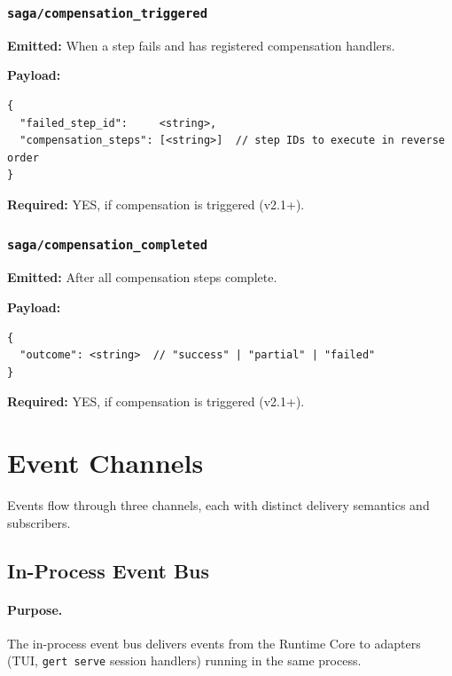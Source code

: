 \subsubsection{\texttt{saga/compensation\_triggered}}

\textbf{Emitted:} When a step fails and has registered compensation handlers.

\textbf{Payload:}
\begin{verbatim}
{
  "failed_step_id":     <string>,
  "compensation_steps": [<string>]  // step IDs to execute in reverse order
}
\end{verbatim}

\textbf{Required:} YES, if compensation is triggered (v2.1+).


\subsubsection{\texttt{saga/compensation\_completed}}

\textbf{Emitted:} After all compensation steps complete.

\textbf{Payload:}
\begin{verbatim}
{
  "outcome": <string>  // "success" | "partial" | "failed"
}
\end{verbatim}

\textbf{Required:} YES, if compensation is triggered (v2.1+).

\section{Event Channels}

Events flow through three channels, each with distinct delivery semantics and subscribers.

\subsection{In-Process Event Bus}

\paragraph{Purpose.} The in-process event bus delivers events from the Runtime Core to adapters (TUI, \texttt{gert serve} session handlers) running in the same process.

